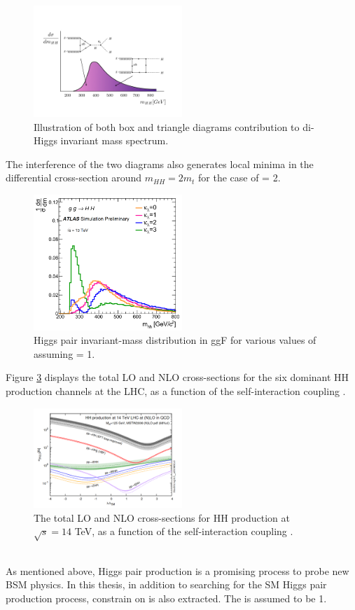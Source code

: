 \begin{figure}[htbp]
    \centering
    \includegraphics[width=0.5\textwidth]{Ch1/Img/illustration_mHH.jpeg}
    \caption{Illustration of both box and triangle diagrams contribution to di-Higgs invariant mass spectrum.}
    \label{fig:chap1:HH:BSM:I}
\end{figure}
The interference of the two diagrams also generates local minima in the differential cross-section around $m_{HH}=2m_t$ for the case of \kl = 2.
\begin{figure}[htbp]
    \centering
    \includegraphics[width=0.5\textwidth]{Ch1/Img/mHH.png}
    \caption{Higgs pair invariant-mass distribution in ggF for various values of \kl assuming \kt = 1.}
    \label{fig:chap1:HH:BSM:MHH}
\end{figure}
Figure \ref{fig:chap1:HH:BSM:XSEC:L} displays the total LO and NLO cross-sections for the six dominant HH production channels at the LHC, as a function of the self-interaction coupling \kl.
\begin{figure}[htbp]
    \centering
    \includegraphics[width=0.5\textwidth]{Ch1/Img/HH_Xsec_as_lambda.png}
    \caption{The total LO and NLO cross-sections for HH production at $\sqrt{s}=14$ TeV, as a function of the self-interaction coupling \kl.}
    \label{fig:chap1:HH:BSM:XSEC:L}
\end{figure}
\\
As mentioned above, Higgs pair production is a promising process to probe new BSM physics. In this thesis, in addition to searching for the SM Higgs pair production process, constrain on \kl is also extracted. The \kt is assumed to be 1.

